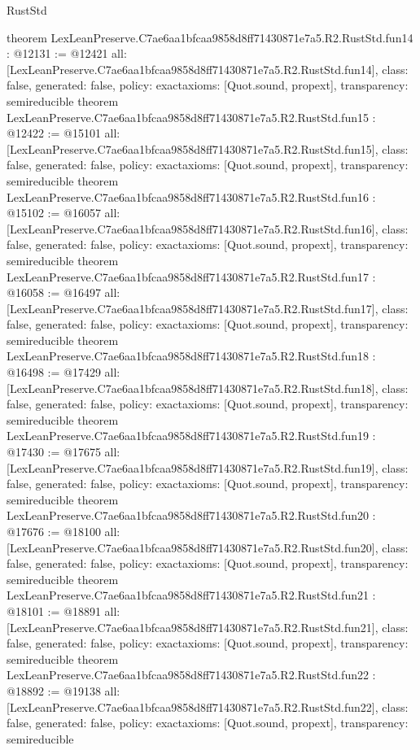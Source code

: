 \begin{lexlean}{RustStd}
\begin{coremodule}
{}
theorem LexLeanPreserve.C7ae6aa1bfcaa9858d8ff71430871e7a5.R2.RustStd.fun14 : @12131 := @12421 {
  all: [LexLeanPreserve.C7ae6aa1bfcaa9858d8ff71430871e7a5.R2.RustStd.fun14],
  class: false,
  generated: false,
  policy: exact{axioms: [Quot.sound, propext]},
  transparency: semireducible
}
theorem LexLeanPreserve.C7ae6aa1bfcaa9858d8ff71430871e7a5.R2.RustStd.fun15 : @12422 := @15101 {
  all: [LexLeanPreserve.C7ae6aa1bfcaa9858d8ff71430871e7a5.R2.RustStd.fun15],
  class: false,
  generated: false,
  policy: exact{axioms: [Quot.sound, propext]},
  transparency: semireducible
}
theorem LexLeanPreserve.C7ae6aa1bfcaa9858d8ff71430871e7a5.R2.RustStd.fun16 : @15102 := @16057 {
  all: [LexLeanPreserve.C7ae6aa1bfcaa9858d8ff71430871e7a5.R2.RustStd.fun16],
  class: false,
  generated: false,
  policy: exact{axioms: [Quot.sound, propext]},
  transparency: semireducible
}
theorem LexLeanPreserve.C7ae6aa1bfcaa9858d8ff71430871e7a5.R2.RustStd.fun17 : @16058 := @16497 {
  all: [LexLeanPreserve.C7ae6aa1bfcaa9858d8ff71430871e7a5.R2.RustStd.fun17],
  class: false,
  generated: false,
  policy: exact{axioms: [Quot.sound, propext]},
  transparency: semireducible
}
theorem LexLeanPreserve.C7ae6aa1bfcaa9858d8ff71430871e7a5.R2.RustStd.fun18 : @16498 := @17429 {
  all: [LexLeanPreserve.C7ae6aa1bfcaa9858d8ff71430871e7a5.R2.RustStd.fun18],
  class: false,
  generated: false,
  policy: exact{axioms: [Quot.sound, propext]},
  transparency: semireducible
}
theorem LexLeanPreserve.C7ae6aa1bfcaa9858d8ff71430871e7a5.R2.RustStd.fun19 : @17430 := @17675 {
  all: [LexLeanPreserve.C7ae6aa1bfcaa9858d8ff71430871e7a5.R2.RustStd.fun19],
  class: false,
  generated: false,
  policy: exact{axioms: [Quot.sound, propext]},
  transparency: semireducible
}
theorem LexLeanPreserve.C7ae6aa1bfcaa9858d8ff71430871e7a5.R2.RustStd.fun20 : @17676 := @18100 {
  all: [LexLeanPreserve.C7ae6aa1bfcaa9858d8ff71430871e7a5.R2.RustStd.fun20],
  class: false,
  generated: false,
  policy: exact{axioms: [Quot.sound, propext]},
  transparency: semireducible
}
theorem LexLeanPreserve.C7ae6aa1bfcaa9858d8ff71430871e7a5.R2.RustStd.fun21 : @18101 := @18891 {
  all: [LexLeanPreserve.C7ae6aa1bfcaa9858d8ff71430871e7a5.R2.RustStd.fun21],
  class: false,
  generated: false,
  policy: exact{axioms: [Quot.sound, propext]},
  transparency: semireducible
}
theorem LexLeanPreserve.C7ae6aa1bfcaa9858d8ff71430871e7a5.R2.RustStd.fun22 : @18892 := @19138 {
  all: [LexLeanPreserve.C7ae6aa1bfcaa9858d8ff71430871e7a5.R2.RustStd.fun22],
  class: false,
  generated: false,
  policy: exact{axioms: [Quot.sound, propext]},
  transparency: semireducible
}
\end{coremodule}
\end{lexlean}
